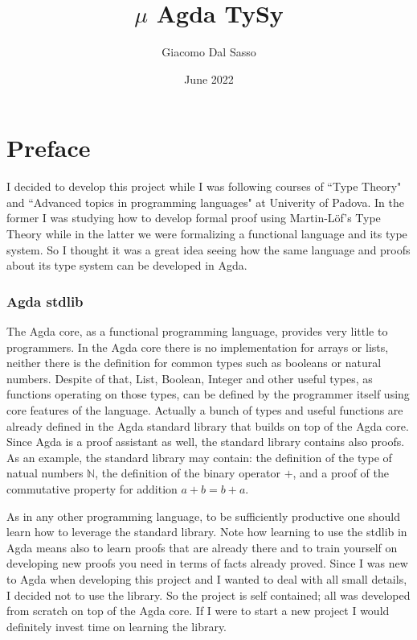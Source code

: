\documentclass{article}
\title{$\mu$ Agda TySy}
\author{Giacomo Dal Sasso}
\date{June 2022}
\begin{document}
\maketitle


\section{Preface}

I decided to develop this project while I was following courses of ``Type Theory" and ``Advanced topics in programming languages" at Univerity of Padova.
In the former I was studying how to develop formal proof using Martin-Löf's Type Theory while in the latter we were formalizing a functional language and its type system.
So I thought it was a great idea seeing how the same language and proofs about its type system can be developed in Agda.


\subsubsection*{Agda stdlib}
The Agda core, as a functional programming language, provides very little to programmers.
In the Agda core there is no implementation for arrays or lists, neither there is the definition for common types such as booleans or natural numbers.
Despite of that, List, Boolean, Integer and other useful types, as functions operating on those types, can be defined by the programmer itself using core features of the language.
Actually a bunch of types and useful functions are already defined in the Agda standard library that builds on top of the Agda core.
Since Agda is a proof assistant as well, the standard library contains also proofs.
As an example, the standard library may contain: the definition of the type of natual numbers $\mathbb{N}$, the definition of the binary operator $+$, and a proof of the commutative property for addition $a + b = b + a$.

As in any other programming language, to be sufficiently productive one should learn how to leverage the standard library.
Note how learning to use the stdlib in Agda means also to learn proofs that are already there and to train yourself on developing new proofs you need in terms of facts already proved.
Since I was new to Agda when developing this project and I wanted to deal with all small details, I decided not to use the library.
So the project is self contained; all was developed from scratch on top of the Agda core.
If I were to start a new project I would definitely invest time on learning the library.
\end{document}
